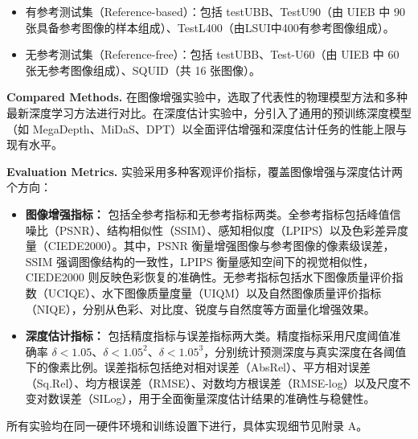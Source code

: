 \documentclass[twocolumn]{article}
\begin{document}
\begin{itemize}
\item 有参考测试集（Reference-based）：包括 testUBB、TestU90（由 UIEB 中 90 张具备参考图像的样本组成）、TestL400（由LSUI中400有参考图像组成）。
\item 无参考测试集（Reference-free）：包括 testUBB、Test-U60（由 UIEB 中 60 张无参考图像组成）、SQUID（共 16 张图像）。
\end{itemize}

\textbf{Compared Methods.}
在图像增强实验中，选取了代表性的物理模型方法和多种最新深度学习方法进行对比。在深度估计实验中，分引入了通用的预训练深度模型（如 MegaDepth、MiDaS、DPT）以全面评估增强和深度估计任务的性能上限与现有水平。

\textbf{Evaluation Metrics.}
实验采用多种客观评价指标，覆盖图像增强与深度估计两个方向：

\begin{itemize}
\item \textbf{图像增强指标：} 包括全参考指标和无参考指标两类。全参考指标包括峰值信噪比（PSNR）、结构相似性（SSIM）、感知相似度（LPIPS）以及色彩差异度量（CIEDE2000）。其中，PSNR 衡量增强图像与参考图像的像素级误差，SSIM 强调图像结构的一致性，LPIPS 衡量感知空间下的视觉相似性，CIEDE2000 则反映色彩恢复的准确性。无参考指标包括水下图像质量评价指数（UCIQE）、水下图像质量度量（UIQM）以及自然图像质量评价指标（NIQE），分别从色彩、对比度、锐度与自然度等方面量化增强效果。

\item \textbf{深度估计指标：} 包括精度指标与误差指标两大类。精度指标采用尺度阈值准确率 $\delta < 1.05$、$\delta < 1.05^2$、$\delta < 1.05^3$，分别统计预测深度与真实深度在各阈值下的像素比例。误差指标包括绝对相对误差（AbsRel）、平方相对误差（Sq.Rel）、均方根误差（RMSE）、对数均方根误差（RMSE-log）以及尺度不变对数误差（SILog），用于全面衡量深度估计结果的准确性与稳健性。
\end{itemize}


所有实验均在同一硬件环境和训练设置下进行，具体实现细节见附录 A。
\end{document}
